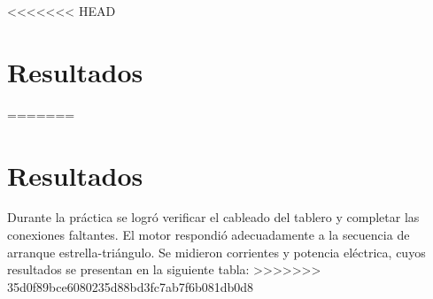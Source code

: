 <<<<<<< HEAD
\section{Resultados}
=======
\section{Resultados}
Durante la práctica se logró verificar el cableado del tablero y completar las conexiones faltantes. 
El motor respondió adecuadamente a la secuencia de arranque estrella-triángulo. 
Se midieron corrientes y potencia eléctrica, cuyos resultados se presentan en la siguiente tabla:
>>>>>>> 35d0f89bce6080235d88bd3fc7ab7f6b081db0d8
